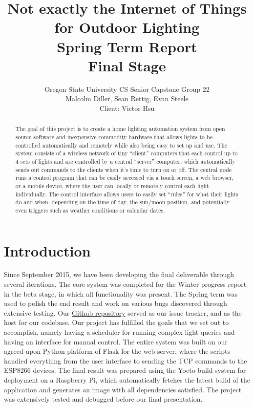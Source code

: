 \documentclass[10pt,draftclsnofoot,onecolumn]{IEEEtran}
\title{Not exactly the Internet of Things for Outdoor Lighting\\ Spring Term Report\\ Final Stage}
\author{Oregon State University CS Senior Capstone Group 22\\Malcolm Diller, Sean Rettig, Evan Steele\\Client: Victor Hsu}
\begin{document}
\maketitle
\begin{abstract}
The goal of this project is to create a home lighting automation system from
open source software and inexpensive commodity hardware that allows lights to
be controlled automatically and remotely while also being easy to set up and
use. The system consists of a wireless network of tiny ``client'' computers that
each control up to 4 sets of lights and are controlled by a central ``server''
computer, which automatically sends out commands to the clients when it's
time to turn on or off.  The central node runs a control program that can
be easily accessed via a touch screen, a web browser, or a mobile device, where
the user can locally or remotely control each light individually. The control
interface allows users to easily set ``rules'' for what their lights do and
when, depending on the time of day, the sun/moon position, and potentially even
triggers such as weather conditions or calendar dates.\\

\end{abstract}
\pagebreak
\tableofcontents
\newpage
\section{Introduction}
Since September 2015, we have been developing the final deliverable through several
iterations. The core system was completed for the Winter progress report in the beta
stage, in which all functionality was present. The Spring term was used to polish the
end result and work on various bugs discovered through extensive testing. Our \href{https://github.com/rettigs/cs-senior-capstone}{Github repository} served as our issue tracker, and as the host for our codebase.
Our project has fulfilled the goals that we set out to accomplish, namely having a scheduler for running complex light queries and having an interface for manual control.
The entire system was built on our agreed-upon Python platform of Flask for the web server, where the scripts handled everything from the user interface to sending the TCP commands to the ESP8266 devices.
The final result was prepared using the Yocto build system for deployment on a Raspberry Pi, which automatically fetches the latest build of the application and generates an image with all dependencies satisfied.
The project was extensively tested and debugged before our final presentation.
\end{document}
